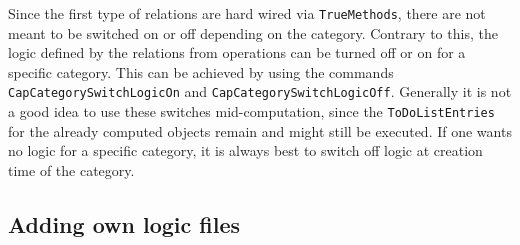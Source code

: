 Since the first type of relations are hard wired via \texttt{TrueMethods}, there are not
meant to be switched on or off depending on the category. Contrary to this, the logic defined
by the relations from operations can be turned off or on for a specific \CapPkg category.
This can be achieved by using the commands \texttt{CapCategorySwitchLogicOn} and \texttt{CapCategorySwitchLogicOff}.
Generally it is not a good idea to use these switches mid-computation, since the \texttt{ToDoListEntries} for the
already computed objects remain and might still be executed. If one wants no logic for a specific category,
it is always best to switch off logic at creation time of the category.

\subsection{Adding own logic files}

